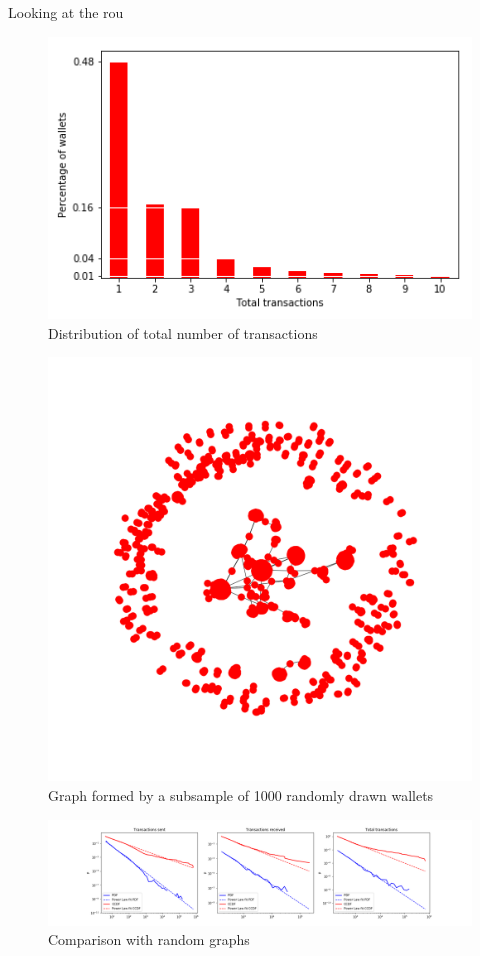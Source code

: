 Looking at the rou

\begin{figure}[h]
\centering
\includegraphics[scale=0.5]{../pics/distribution.png}
\caption{Distribution of total number of transactions}
\end{figure}

\begin{figure}
\centering
\includegraphics[scale=0.45]{../analysis/graph-subsample-1000.png}
\caption{Graph formed by a subsample of 1000 randomly drawn wallets}
\end{figure}


\begin{figure}
\centering
\includegraphics[width=\textwidth]{../analysis/power-law-fit.png}
\caption{Comparison with random graphs}
\end{figure}
